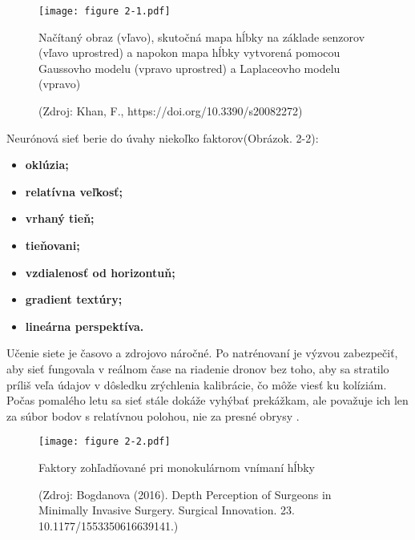 \begin{figure}[ht!]
    \centering
    \texttt{[image: figure 2-1.pdf]}
    \caption{Načítaný obraz (vľavo), skutočná mapa hĺbky na základe senzorov (vľavo uprostred) a napokon mapa hĺbky vytvorená pomocou Gaussovho modelu (vpravo uprostred) a Laplaceovho modelu (vpravo)}
    \captionsetup{font=footnotesize, justification=centering, skip=5pt}
    \caption*{(Zdroj: Khan, F., https://doi.org/10.3390/s20082272)}
    \label{o:2-1}
\end{figure}

Neurónová sieť berie do úvahy niekoľko faktorov(Obrázok. 2-2):
\begin{itemize}
    \item \textbf{oklúzia;}
    \item \textbf{relatívna veľkosť;}
    \item \textbf{vrhaný tieň;}
    \item \textbf{tieňovani;}
    \item \textbf{vzdialenosť od horizontuň;}
    \item \textbf{gradient textúry;}
    \item \textbf{lineárna perspektíva.}
\end{itemize}
Učenie siete je časovo a zdrojovo náročné. Po natrénovaní je výzvou zabezpečiť, aby sieť fungovala v reálnom čase na riadenie dronov bez toho, aby sa stratilo príliš veľa údajov v dôsledku zrýchlenia kalibrácie, čo môže viesť ku kolíziám. Počas pomalého letu sa sieť stále dokáže vyhýbať prekážkam, ale považuje ich len za súbor bodov s relatívnou polohou, nie za presné obrysy \citep{aabed2012depth}.

\begin{figure}[ht!]
    \centering
    \texttt{[image: figure 2-2.pdf]}
    \caption{Faktory zohľadňované pri monokulárnom vnímaní hĺbky}
    \captionsetup{font=footnotesize, justification=centering, skip=5pt}
    \caption*{(Zdroj: Bogdanova (2016). Depth Perception of Surgeons in Minimally Invasive Surgery. Surgical Innovation. 23. 10.1177/1553350616639141.)}
    \label{o:2-2}
\end{figure}

